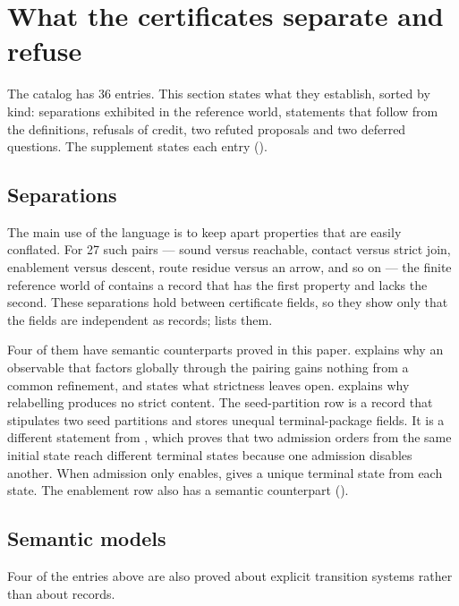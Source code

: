 \section{What the certificates separate and refuse}
\label{sec:separations}

The catalog has 36 entries. This section states what they establish, sorted by kind:
separations exhibited in the reference world, statements that follow from the definitions,
refusals of credit, two refuted proposals and two deferred questions. The supplement
states each entry ().

\subsection{Separations}
\label{sec:sep-separations}

The main use of the language is to keep apart properties that are easily conflated. For 27
such pairs --- sound versus reachable, contact versus strict join, enablement versus descent,
route residue versus an arrow, and so on --- the finite reference world of 
contains a record that has the first property and lacks the second. These separations hold
between certificate fields, so they show only that the fields are independent as records;
 lists them.

Four of them have semantic counterparts proved in this paper.
 explains why an observable that factors globally through the pairing gains
nothing from a common refinement, and  states what strictness
leaves open.
 explains why relabelling produces no strict content.
The seed-partition row is a record that stipulates two seed partitions and stores unequal
terminal-package fields. It is a different statement from , which proves
that two admission orders from the same initial state reach different terminal states
because one admission disables another. When admission only enables,
 gives a unique terminal state from each state. The enablement row also
has a semantic counterpart ().

\subsection{Semantic models}
\label{sec:sep-semantic}

Four of the entries above are also proved about explicit transition systems rather than about
records.

